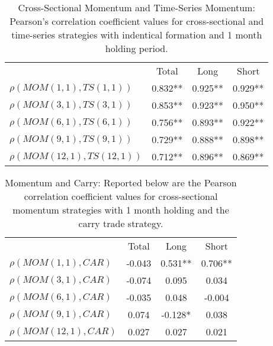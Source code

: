 \documentclass{article}
\begin{document}
\begin{table}[htbp]
  \centering
    \caption{Cross-Sectional Momentum and Time-Series Momentum: Pearson's correlation coefficient values for cross-sectional and time-series strategies with indentical formation and 1 month holding period.}
    \begin{tabular}{lccc}
    \toprule
    \multicolumn{1}{r}{} & Total & Long  & Short \\
    $\rho(MOM(1,1),TS(1,1))$ & 0.832** & 0.925** & 0.929** \\
    $\rho(MOM(3,1),TS(3,1))$ & 0.853** & 0.923** & 0.950** \\
    $\rho(MOM(6,1),TS(6,1))$ & 0.756** & 0.893** & 0.922** \\
    $\rho(MOM(9,1),TS(9,1))$ & 0.729** & 0.888** & 0.898** \\
    $\rho(MOM(12,1),TS(12,1))$ & 0.712** & 0.896** & 0.869** \\
    \bottomrule
    \end{tabular}%
  \label{TSCOR}%
\end{table}%


\begin{table}[htbp]
  \centering
    \caption{Momentum and Carry: Reported below are the Pearson correlation coefficient values for cross-sectional momentum strategies with 1 month holding and the carry trade strategy.}
    \begin{tabular}{lccc}
    \toprule
    \multicolumn{1}{r}{} & Total & Long  & Short \\
    $\rho(MOM(1,1),CAR)$ & -0.043 & 0.531** & 0.706** \\
    $\rho(MOM(3,1),CAR)$ & -0.074 & 0.095 & 0.034 \\
    $\rho(MOM(6,1),CAR)$ & -0.035 & 0.048 & -0.004 \\
    $\rho(MOM(9,1),CAR)$ & 0.074 & -0.128* & 0.038 \\
    $\rho(MOM(12,1),CAR)$ & 0.027 & 0.027 & 0.021 \\
    \bottomrule
    \end{tabular}%
  \label{tab:addlabel}%
\end{table}%
\end{document}
